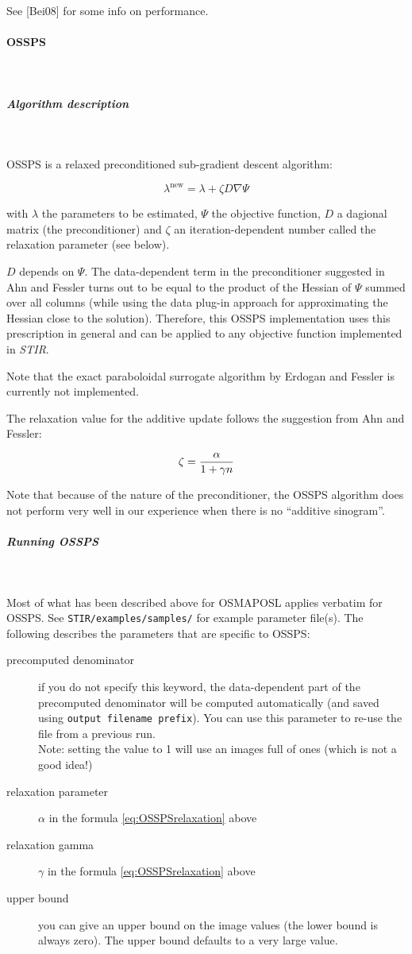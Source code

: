 \documentclass{article}
\newcommand{\subsubsubsection}[1]{\paragraph{#1}\mbox{} \\}
\newcommand{\subsubsubsubsection}[1]{\subparagraph{#1} \mbox{} \\}
\begin{document}
See [Bei08] for some info on performance.

{ \subsubsubsection{OSSPS}
}
\label{sec:OSSPS}
  { \subsubsubsubsection{Algorithm description}
  }
  OSSPS is a relaxed preconditioned sub-gradient descent algorithm:

  \[ \lambda^\mathrm{new} = \lambda + \zeta D \nabla \Psi \]

  with $\lambda$ the parameters to be estimated,
  $\Psi$ the objective function,
  $D$ a dagional matrix (the preconditioner)
  and $\zeta$ an iteration-dependent number called the relaxation parameter (see below).

  $D$ depends on $\Psi$. The data-dependent term in the preconditioner 
  suggested in Ahn and Fessler turns out to be equal to the product of the Hessian of 
  $\Psi$ summed over all columns (while using the data plug-in approach for 
  approximating the Hessian close to the solution). Therefore, this OSSPS 
  implementation uses this prescription in general and can be applied to any objective
   function implemented in \textit{STIR}.  

  Note that the exact paraboloidal surrogate algorithm by Erdogan and Fessler is currently
  not implemented.

  The relaxation value for the additive update follows the suggestion from Ahn and Fessler:

 \begin{equation}
  \zeta= { \alpha \over 1+ \gamma n } \label{eq:OSSPSrelaxation}
 \end{equation} 

  Note that because of the nature of the preconditioner, the OSSPS algorithm does not
  perform very well in our experience when there is no ``additive sinogram''.

{ \subsubsubsubsection{Running OSSPS}
}

 Most of what has been described above for OSMAPOSL applies verbatim for OSSPS. 
 See \texttt{STIR/examples/samples/} for example parameter file(s). The
 following describes the parameters that are specific to OSSPS:

 \begin{description}
 \item[precomputed denominator]
   if you do not specify this keyword, the data-dependent part of the
   precomputed denominator will be computed automatically (and saved using
   \texttt{output filename prefix}). You can use this parameter to
   re-use the file from a previous run. \\
   Note: setting the value to 1 will use an images full of ones (which is not a good idea!)

 \item[relaxation parameter]
   $\alpha$ in the formula \ref{eq:OSSPSrelaxation} above
 \item[relaxation gamma]
   $\gamma$ in the formula \ref{eq:OSSPSrelaxation} above

 \item[upper bound]
  you can give an upper bound on the image values (the lower bound is always zero). The upper
  bound defaults to a very large value.
\end{description}
\end{document}
